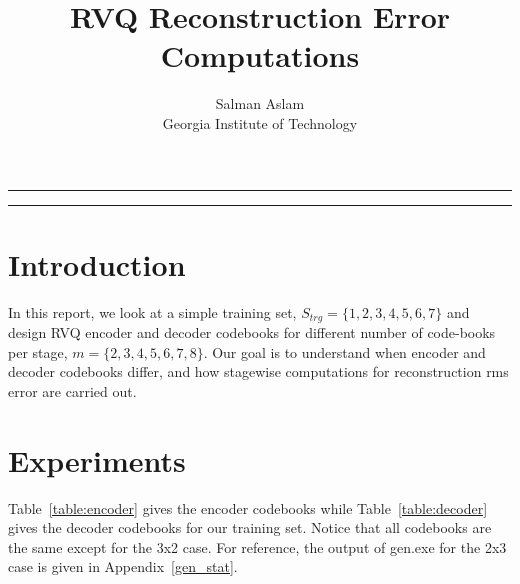 
\title{RVQ Reconstruction Error Computations}
\author{Salman Aslam\\ Georgia Institute of Technology}
\date{}


\maketitle
\rule[0pt]{\textwidth}{1pt}
\tableofcontents
\rule[0pt]{\textwidth}{1pt}


\section{Introduction}
In this report, we look at a simple training set, $S_{trg}=\{1,2,3,4,5,6,7\}$ and design RVQ encoder and decoder codebooks for different number of code-books per stage, $m=\{2,3,4,5,6,7,8\}$.  Our goal is to understand when encoder and decoder codebooks differ, and how stagewise computations for reconstruction rms error are carried out.


\section{Experiments}

Table~\ref{table:encoder} gives the encoder codebooks while Table~\ref{table:decoder} gives the decoder codebooks for our training set.  Notice that all codebooks are the same except for the 3x2 case.  For reference, the output of gen.exe for the 2x3 case is given in Appendix~\ref{gen_stat}.

